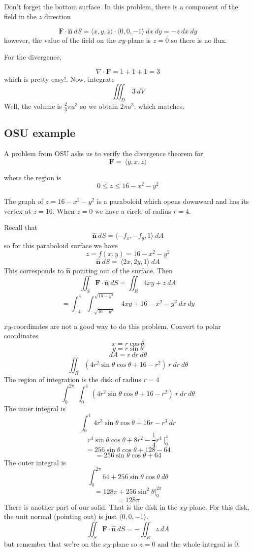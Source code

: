 \documentclass[11pt, oneside]{article}
\begin{document}
Don't forget the bottom surface.  In this problem, there is a component of the field in the $z$ direction

\[ \mathbf{F} \cdot \hat{\mathbf{n}} \ dS =  \langle x,y,z \rangle \cdot  \langle 0,0,-1 \rangle \ dx \ dy = -z \ dx \ dy\]
however, the value of the field on the $xy$-plane is $z=0$ so there is no flux.

For the divergence,

\[ \nabla \cdot \mathbf{F} = 1 + 1 + 1 = 3 \]
which is pretty easy!.  Now, integrate
\[ \iiint_D \ 3 \ dV \]
Well, the volume is $\frac{2}{3} \pi a^3$ so we obtain $2 \pi a^3$, which matches.

\subsection*{OSU example}

A problem from OSU asks us to verify the divergence theorem for 
\[ \mathbf{F} = \ \langle y,x,z \rangle \]

where the region is
\[ 0 \le z \le 16 -x^2 -y^2 \]

The graph of $z=16 -x^2 -y^2$ is a paraboloid which opens downward and has its vertex at $z=16$.  When $z=0$ we have a circle of radius $r=4$.

Recall that 
\[ \hat{\mathbf{n}} \ dS = \langle -f_x,-f_y,1 \rangle  \ dA \]
 so for this paraboloid surface we have
 \[ z = f(x,y) = 16 - x^2 - y^2 \]
\[ \hat{\mathbf{n}} \ dS = \ \langle 2x,2y,1 \rangle  \ dA \]
This corresponds to $\hat{\mathbf{n}}$ pointing out of the surface.
Then
\[ \iint_S \mathbf{F} \cdot \hat{\mathbf{n}} \ dS  = \iint_R 4xy + z \ dA \]
\[ =  \int_{-4}^{4} \int_{-\sqrt{16-y^2}}^{\sqrt{16-y^2}} \ 4xy + 16 - x^2 - y^2 \ dx \ dy \]

$xy$-coordinates are not a good way to do this problem.  Convert to polar coordinates
\[ x = r \cos \theta \]
\[ y = r \sin \theta \]
\[ dA = r \ dr \ d\theta \]
\[  \iint_R (4r^2 \sin \theta \cos \theta + 16 - r^2) \ r \ dr \ d\theta \]
The region of integration is the disk of radius $r=4$
\[ \int_0^{2\pi} \ \int_0^4 \ (4 r^2 \sin \theta \cos \theta + 16 - r^2) \ r \ dr \ d \theta \]
The inner integral is
\[ \int_0^4 \ 4 r^3 \sin \theta \cos \theta + 16r - r^3 \ dr \]
\[ r^4  \sin \theta \cos \theta + 8r^2 - \frac{1}{4}r^4 \ \bigg |_0^4 \]
\[ = 256   \sin \theta \cos \theta + 128 - 64 \]
\[ = 256   \sin \theta \cos \theta + 64 \]
The outer integral is
\[ \int_0^{2\pi} 64 +  256  \sin \theta \cos \theta \ d \theta \]
\[ = 128 \pi + 256 \sin^2 \theta \bigg |_0^{2\pi} \]
\[ = 128 \pi  \]
There is another part of our solid.  That is the disk in the $xy$-plane.  For this disk, the unit normal (pointing out) is just $\langle 0,0,-1 \rangle$.
\[ \iint_S \mathbf{F} \cdot \hat{\mathbf{n}} \ dS  = -\iint_R z \ dA \]
but remember that we're on the $xy$-plane so $z=0$ and the whole integral is $0$.
\end{document}
